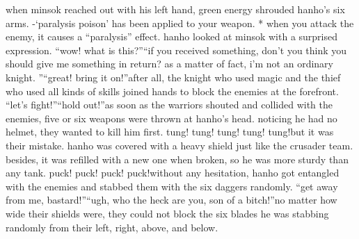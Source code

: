 when minsok reached out with his left hand, green energy shrouded hanho’s six arms.
-‘paralysis poison’ has been applied to your weapon.
* when you attack the enemy, it causes a “paralysis” effect.
hanho looked at minsok with a surprised expression.
“wow! what is this?”“if you received something, don’t you think you should give me something in return? as a matter of fact, i’m not an ordinary knight.
”“great! bring it on!”after all, the knight who used magic and the thief who used all kinds of skills joined hands to block the enemies at the forefront.
“let’s fight!”“hold out!”as soon as the warriors shouted and collided with the enemies, five or six weapons were thrown at hanho’s head.
 noticing he had no helmet, they wanted to kill him first.
tung! tung! tung! tung! tung!but it was their mistake.
 hanho was covered with a heavy shield just like the crusader team.
 besides, it was refilled with a new one when broken, so he was more sturdy than any tank.
puck! puck! puck! puck!without any hesitation, hanho got entangled with the enemies and stabbed them with the six daggers randomly.
“get away from me, bastard!”“ugh, who the heck are you, son of a bitch!”no matter how wide their shields were, they could not block the six blades he was stabbing randomly from their left, right, above, and below.

